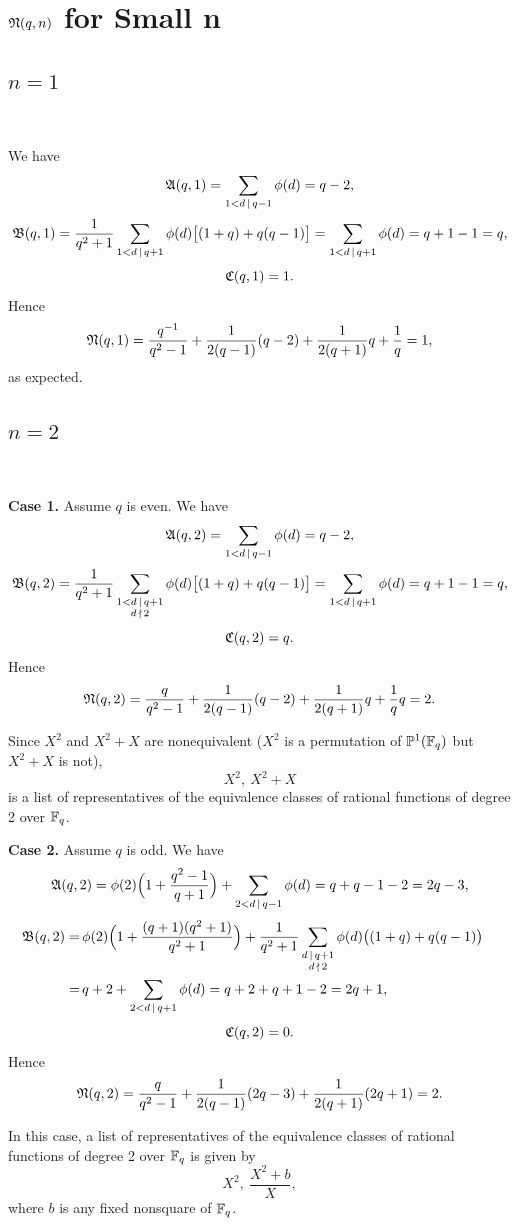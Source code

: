 \documentclass{amsart}
\numberwithin{equation}{section}
\theoremstyle{definition}
\newcommand{\f}{\Bbb F}
\begin{document}
\section{$\frak N(q,n)$ for Small n}

\subsection{$n=1$}\

We have
\[
\frak A(q,1)=\sum_{1<d\,\mid\, q-1}\phi(d)=q-2,
\]
\[
\frak B(q,1)=\frac 1{q^2+1}\sum_{1<d\,\mid\, q+1}\phi(d)\bigl[(1+q)+q(q-1)\bigr]=\sum_{1<d\,\mid\, q+1}\phi(d)=q+1-1=q,
\]
\[
\frak C(q,1)=1.
\]
Hence
\[
\frak N(q,1)=\frac{q^{-1}}{q^2-1}+\frac 1{2(q-1)}(q-2)+\frac 1{2(q+1)}q+\frac 1q=1,
\]
as expected.

\subsection{$n=2$}\ 

{\bf Case 1.} Assume $q$ is even. We have
\[
\frak A(q,2)=\sum_{1<d\,\mid\, q-1}\phi(d)=q-2,
\]
\[
\frak B(q,2)=\frac 1{q^2+1}\sum_{\substack{1<d\,\mid\, q+1\cr d\,\nmid\, 2}}\phi(d)\bigl[(1+q)+q(q-1)\bigr]=\sum_{1<d\,\mid\, q+1}\phi(d)=q+1-1=q,
\]
\[
\frak C(q,2)=q.
\]
Hence
\[
\frak N(q,2)=\frac q{q^2-1}+\frac 1{2(q-1)}(q-2)+\frac 1{2(q+1)}q+\frac 1q q=2.
\]

Since $X^2$ and $X^2+X$ are nonequivalent ($X^2$ is a permutation of $\Bbb P^1(\f_q)$ but $X^2+X$ is not), 
\[
X^2,\ X^2+X
\]
is a list of representatives of the equivalence classes of rational functions of degree 2 over $\f_q$.

\medskip
{\bf Case 2.} Assume $q$ is odd. We have
\[
\frak A(q,2)=\phi(2)\Bigl(1+\frac{q^2-1}{q+1}\Bigr)+\sum_{2<d\,\mid\, q-1}\phi(d)=q+q-1-2=2q-3,
\]
\begin{align*}
\frak B(q,2)=\,&\phi(2)\Bigl(1+\frac{(q+1)(q^2+1)}{q^2+1}\Bigr)+\frac 1{q^2+1}\sum_{\substack{d\,\mid\, q+1\cr d\,\nmid\, 2}}\phi(d)\bigl((1+q)+q(q-1)\bigr)\cr
=\,&q+2+\sum_{2<d\,\mid\, q+1}\phi(d)=q+2+q+1-2=2q+1,
\end{align*}
\[
\frak C(q,2)=0.
\]
Hence
\[
\frak N(q,2)=\frac q{q^2-1}+\frac 1{2(q-1)}(2q-3)+\frac 1{2(q+1)}(2q+1)=2.
\]

In this case, a list of representatives of the equivalence classes of rational functions of degree 2 over $\f_q$ is given by 
\[
X^2,\ \frac{X^2+b}X,
\]
where $b$ is any fixed nonsquare of $\f_q$. 
\end{document}

